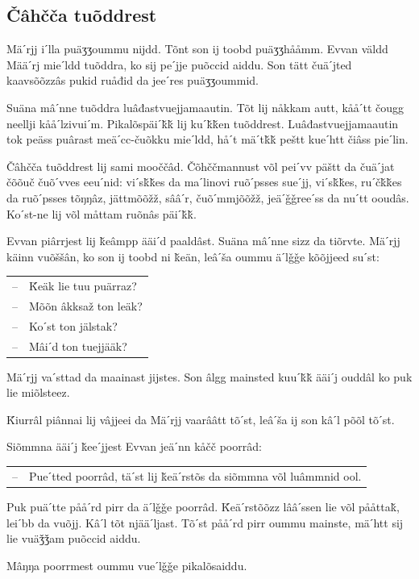 \documentclass{scrbook}
\begin{document}
\subsection*{Čâhčča tuõddrest}
Mäˊrjj iˊlla puäʒʒoummu nijdd. Tõnt son ij toobd puäʒʒhååmm. Evvan väldd Määˊrj mieˊldd tuõddra, ko sij peˊjje puõccid aiddu. Son tätt čuäˊjted kaavsõõzzâs pukid ruåđid da jeeˊres puäʒʒoummid.

Suäna mâˊnne tuõddra luâđastvuejjamaautin. Tõt lij nåkkam autt, kååˊtt čougg neellji kååˊlzivuiˊm. Pikalõspäiˊǩǩ lij kuˊǩǩen tuõddrest. Luâđastvuejjamaautin tok peäss puârast meäˊcc-čuõkku mieˊldd, håˊt mäˊtǩǩ peštt kueˊhtt čiâss pieˊlin.

Čâhčča tuõddrest lij sami mooččâd. Čõhččmannust võl peiˊvv päštt da čuäˊjat čõõuč čuõˊvves eeuˊnid: viˊsǩǩes da maˊlinovi ruõˊpsses sueˊjj, viˊsǩǩes, ruˊčǩǩes da ruõˊpsses tõŋŋâz, jättmõõžž, sââˊr, čuõˊmmjõõžž, jeäˊǧǧreeˊss da nuˊtt ooudâs. Koˊst-­ne lij võl måttam ruõnâs päiˊǩǩ.

Evvan piârrjest lij ǩeâmpp ääiˊd paaldâst. Suäna mâˊnne sizz da tiõrvte. Mäˊrjj käinn vuõššân, ko son ij toobd ni ǩeän, leâˊša oummu äˊlǧǧe kõõjjeed suˊst:

\begin{tabularx}{\textwidth}{l X}
–& Ǩeäk lie tuu puärraz?\\
–& Mõõn âkksaž ton leäk?\\
–& Koˊst ton jälstak?\\
–& Mâiˊd ton tuejjääk?\\
\end{tabularx}

Mäˊrjj vaˊsttad da maainast jijstes. Son âlgg mainsted kuuˊǩǩ ääiˊj ouddâl ko puk lie miõlsteez.

Ǩiurrâl piânnai lij vâjjeei da Mäˊrjj vaarââtt tõˊst, leâˊša ij son kâˊl põõl tõˊst.

Siõmmna ääiˊj ǩeeˊjjest Evvan jeäˊnn kåčč poorrâd:

\begin{tabularx}{\textwidth}{l X}
–& Pueˊtted poorrâd, täˊst lij ǩeäˊrstõs da siõmmna võl luâmmnid ool.\\
\end{tabularx}

Puk puäˊtte pååˊrd pirr da äˊlǧǧe poorrâd. Ǩeäˊrstõõzz lââˊssen lie võl pååttaǩ, leiˊbb da vuõjj. Kâˊl tõt njääˊljast. Tõˊst pååˊrd pirr oummu mainste, mäˊhtt sij lie vuäǯǯam puõccid aiddu.

Mâŋŋa poorrmest oummu vueˊlǧǧe pikalõsaiddu.
\end{document}

